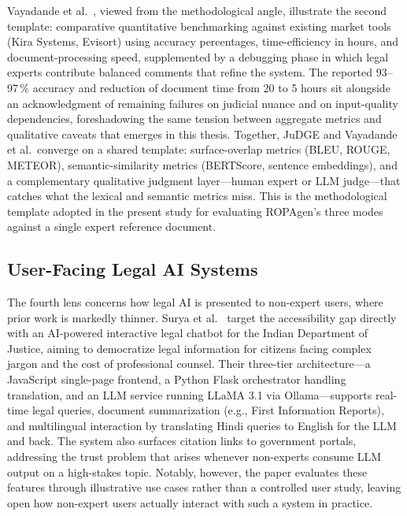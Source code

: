 Vayadande et al.\ \cite{vayadandeAIPoweredLegalDocumentation2024}, viewed from the methodological angle, illustrate the second template: comparative quantitative benchmarking against existing market tools (Kira Systems, Evisort) using accuracy percentages, time-efficiency in hours, and document-processing speed, supplemented by a debugging phase in which legal experts contribute balanced comments that refine the system. The reported 93--97\,\% accuracy and reduction of document time from 20 to 5 hours sit alongside an acknowledgment of remaining failures on judicial nuance and on input-quality dependencies, foreshadowing the same tension between aggregate metrics and qualitative caveats that emerges in this thesis. Together, JuDGE and Vayadande et al.\ converge on a shared template: surface-overlap metrics (BLEU, ROUGE, METEOR), semantic-similarity metrics (BERTScore, sentence embeddings), and a complementary qualitative judgment layer---human expert or LLM judge---that catches what the lexical and semantic metrics miss. This is the methodological template adopted in the present study for evaluating ROPAgen's three modes against a single expert reference document.

\subsection{User-Facing Legal AI Systems}

The fourth lens concerns how legal AI is presented to non-expert users, where prior work is markedly thinner. Surya et al.\ \cite{suryaAIPoweredInteractiveLegal2025} target the accessibility gap directly with an AI-powered interactive legal chatbot for the Indian Department of Justice, aiming to democratize legal information for citizens facing complex jargon and the cost of professional counsel. Their three-tier architecture---a JavaScript single-page frontend, a Python Flask orchestrator handling translation, and an LLM service running LLaMA 3.1 via Ollama---supports real-time legal queries, document summarization (e.g., First Information Reports), and multilingual interaction by translating Hindi queries to English for the LLM and back. The system also surfaces citation links to government portals, addressing the trust problem that arises whenever non-experts consume LLM output on a high-stakes topic. Notably, however, the paper evaluates these features through illustrative use cases rather than a controlled user study, leaving open how non-expert users actually interact with such a system in practice.

